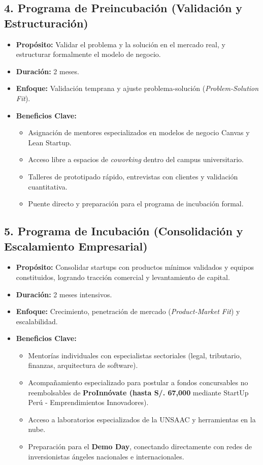 ﻿\documentclass[12pt,a4paper]{article}
\begin{document}
\subsection{4. Programa de Preincubación (Validación y Estructuración)}
\begin{itemize}[leftmargin=*]
    \item \textbf{Propósito:} Validar el problema y la solución en el mercado real, y estructurar formalmente el modelo de negocio.
    \item \textbf{Duración:} 2 meses.
    \item \textbf{Enfoque:} Validación temprana y ajuste problema-solución (\textit{Problem-Solution Fit}).
    \item \textbf{Beneficios Clave:}
    \begin{itemize}
        \item Asignación de mentores especializados en modelos de negocio Canvas y Lean Startup.
        \item Acceso libre a espacios de \textit{coworking} dentro del campus universitario.
        \item Talleres de prototipado rápido, entrevistas con clientes y validación cuantitativa.
        \item Puente directo y preparación para el programa de incubación formal.
    \end{itemize}
\end{itemize}

\subsection{5. Programa de Incubación (Consolidación y Escalamiento Empresarial)}
\begin{itemize}[leftmargin=*]
    \item \textbf{Propósito:} Consolidar startups con productos mínimos validados y equipos constituidos, logrando tracción comercial y levantamiento de capital.
    \item \textbf{Duración:} 2 meses intensivos.
    \item \textbf{Enfoque:} Crecimiento, penetración de mercado (\textit{Product-Market Fit}) y escalabilidad.
    \item \textbf{Beneficios Clave:}
    \begin{itemize}
        \item Mentorías individuales con especialistas sectoriales (legal, tributario, finanzas, arquitectura de software).
        \item Acompañamiento especializado para postular a fondos concursables no reembolsables de \textbf{ProInnóvate (hasta S/. 67,000} mediante StartUp Perú - Emprendimientos Innovadores).
        \item Acceso a laboratorios especializados de la UNSAAC y herramientas en la nube.
        \item Preparación para el \textbf{Demo Day}, conectando directamente con redes de inversionistas ángeles nacionales e internacionales.
    \end{itemize}
\end{itemize}
\end{document}
